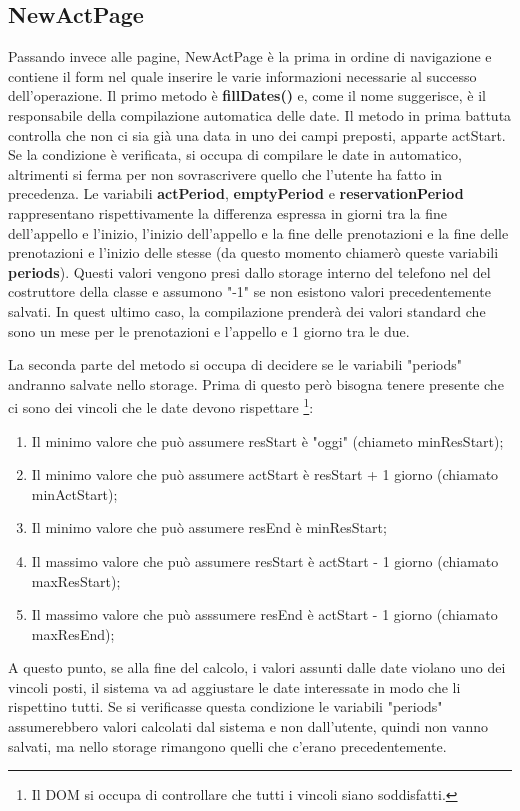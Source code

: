 \documentclass[Lau, oneside, noexaminfo]{sapthesis}%
\begin{document}
\subsection{NewActPage}
Passando invece alle pagine, NewActPage è la prima in ordine di navigazione e contiene il form nel quale inserire le varie informazioni necessarie al successo dell'operazione. Il primo metodo è \textbf{fillDates()} e, come il nome suggerisce, è il responsabile della compilazione automatica delle date. Il metodo in prima battuta controlla che non ci sia già una data in uno dei campi preposti, apparte actStart. Se la condizione è verificata, si occupa di compilare le date in automatico, altrimenti si ferma per non sovrascrivere quello che l'utente ha fatto in precedenza.
Le variabili \textbf{actPeriod}, \textbf{emptyPeriod} e \textbf{reservationPeriod} rappresentano rispettivamente la differenza espressa in giorni tra la fine dell'appello e l'inizio, l'inizio dell'appello e la fine delle prenotazioni e la fine delle prenotazioni e l'inizio delle stesse (da questo momento chiamerò queste variabili \textbf{periods}). Questi valori vengono presi dallo storage interno del telefono nel del costruttore della classe e assumono "-1" se non esistono valori precedentemente salvati. In quest ultimo caso, la compilazione prenderà dei valori standard che sono un mese per le prenotazioni e l'appello e 1 giorno tra le due.

La seconda parte del metodo si occupa di decidere se le variabili "periods" andranno salvate nello storage. Prima di questo però bisogna tenere presente che ci sono dei vincoli che le date devono rispettare \footnote{Il DOM si occupa di controllare che tutti i vincoli siano soddisfatti.}:
\begin{enumerate}
	\item Il minimo valore che può assumere resStart è "oggi" (chiameto minResStart);
	\item Il minimo valore che può assumere actStart è resStart + 1 giorno (chiamato minActStart);
	\item Il minimo valore che può assumere resEnd è minResStart;
	\item Il massimo valore che può assumere resStart è actStart - 1 giorno (chiamato maxResStart);
	\item Il massimo valore che può asssumere resEnd è  actStart - 1 giorno (chiamato maxResEnd);
\end{enumerate}
A questo punto, se alla fine del calcolo, i valori assunti dalle date violano uno dei vincoli posti, il sistema va ad aggiustare le date interessate in modo che li rispettino tutti. Se si verificasse questa condizione le variabili "periods" assumerebbero valori calcolati dal sistema e non dall'utente, quindi non vanno salvati, ma nello storage rimangono quelli che c'erano precedentemente.
\end{document}
